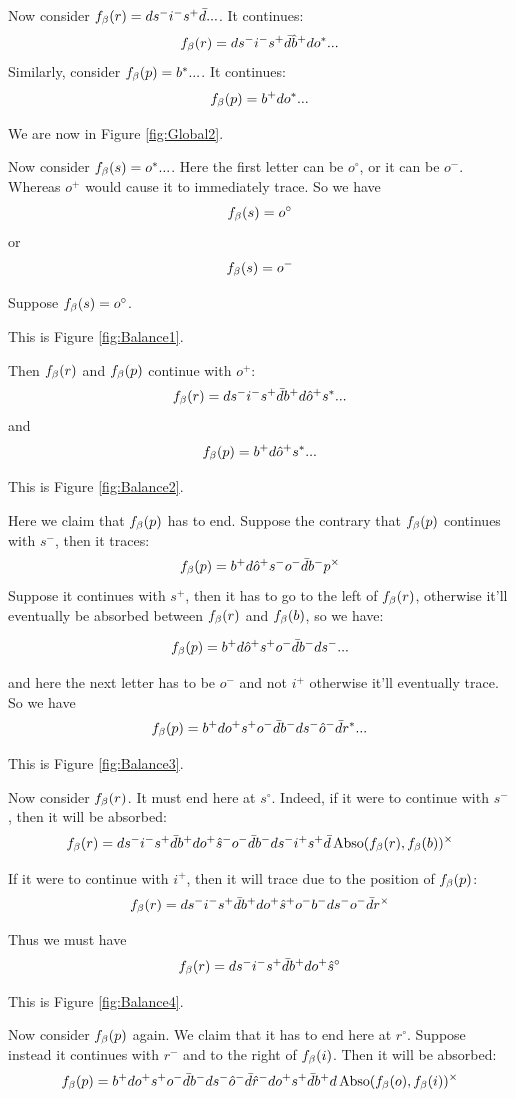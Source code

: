 Now consider $f_\beta(r)= d s^- i^- s^+ \bar{d}...$. It continues:
\[
f_\beta(r)= d s^- i^- s^+ \bar{d} \hat{b}^+ d o^*...
\]
Similarly, consider $f_\beta(p) = b^*...$. It continues:
\[
f_\beta(p) = b^+ d o^*...
\]

We are now in Figure \ref{fig:Global2}.

Now consider $f_\beta(s) = o^*...$. Here the first letter can be $o^\circ$, or it can be $o^-$. Whereas $o^+$ would cause it to immediately trace. So we have
\[
f_\beta(s) = o^\circ
\]
or
\[
f_\beta(s) = o^-
\]

\label{Balance}
Suppose $f_\beta(s) = o^\circ$.

This is Figure \ref{fig:Balance1}.

Then $f_\beta(r)$ and $f_\beta(p)$ continue with $o^+$:
\[
f_\beta(r)= d s^- i^- s^+ \bar{d} b^+ d \hat{o}^+ s^*...
\]
and
\[
f_\beta(p) = b^+ d \hat{o}^+ s^*...
\]

This is Figure \ref{fig:Balance2}. 

Here we claim that $f_\beta(p)$ has to end. Suppose the contrary that $f_\beta(p)$ continues with $s^-$, then it traces:
\[
f_\beta(p) = b^+ d \hat{o}^+ s^- o^- \bar{d} b^- p^\times
\]
Suppose it continues with $s^+$, then it has to go to the left of $f_\beta(r)$, otherwise it'll eventually be absorbed between $f_\beta(r)$ and $f_\beta(b)$, so we have:

\[
f_\beta(p) = b^+ d \hat{o}^+ s^+ o^- \bar{d} b^- d s^-...
\]

and here the next letter has to be $o^-$ and not $i^+$ otherwise it'll eventually trace. So we have
\[
f_\beta(p) = b^+ d o^+ s^+ o^- \bar{d} b^- d s^- \hat{o}^- \bar{d} r^*...
\]

This is Figure \ref{fig:Balance3}.

Now consider $f_\beta(r)$. It must end here at $s^\circ$. Indeed, if it were to continue with $s^-$, then it will be absorbed:
\[
f_\beta(r) = d s^- i^- s^+ \bar{d} b^+ d o^+ \hat{s}^- o^- \bar{d} b^- d s^- i^+ s^+ \bar{d} \operatorname{Abso}(f_\beta(r), f_\beta(b))^\times
\]

If it were to continue with $i^+$, then it will trace due to the position of $f_\beta(p)$:
\[
f_\beta(r) = d s^- i^- s^+ \bar{d} b^+ d o^+ \hat{s}^+ o^- b^- d s^- o^- \bar{d} r^\times
\]

Thus we must have
\[
f_\beta(r) = d s^- i^- s^+ \bar{d} b^+ d o^+ \hat{s}^\circ
\]

This is Figure \ref{fig:Balance4}.

Now consider $f_\beta(p)$ again. We claim that it has to end here at $r^\circ$. Suppose instead it continues with $r^-$ and to the right of $f_\beta(i)$. Then it will be absorbed:
\[
f_\beta(p) = b^+ d o^+ s^+ o^- \bar{d} b^- d s^- \hat{o}^- \bar{d} \hat{r}^- d o^+ s^+ \bar{d} b^+ d \operatorname{Abso}(f_\beta(o), f_\beta(i))^\times 
\]

